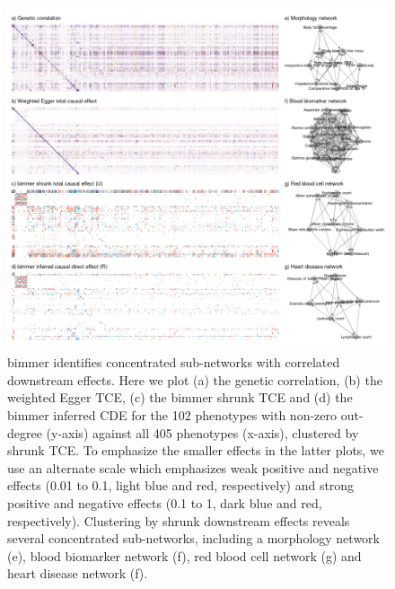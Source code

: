 \documentclass{article}
\begin{document}
\begin{figure}\label{figure5}
\includegraphics[width=\textwidth]{figures/figure5.png}
\caption{bimmer identifies concentrated sub-networks with correlated downstream effects.
Here we plot (a) the genetic correlation, (b) the weighted Egger TCE, (c) the bimmer shrunk
TCE and (d) the bimmer inferred CDE for the 102 phenotypes with non-zero out-degree (y-axis)
against all 405 phenotypes (x-axis), clustered by shrunk TCE. To emphasize the smaller effects
in the latter plots, we use an alternate scale which emphasizes weak positive and negative effects
(0.01 to 0.1, light blue and red, respectively) and strong positive and negative effects
(0.1 to 1, dark blue and red, respectively). Clustering by shrunk downstream effects reveals
several concentrated sub-networks, including a morphology network (e), blood biomarker
network (f), red blood cell network (g) and heart disease network (f).}
\end{figure}
\end{document}
